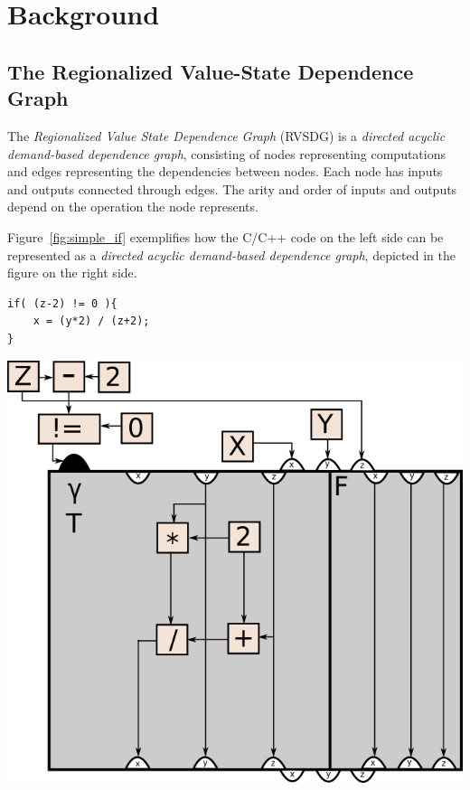 
\clearpage
\section{Background}
\label{background}

\subsection{The Regionalized Value-State Dependence Graph}
\label{background:RVSDG}

The \textit{Regionalized Value State Dependence Graph}\cite{RVSDG:HiPEACpaper}
(RVSDG) is a \textit{directed acyclic demand-based dependence graph},
consisting of nodes representing computations and edges representing the
dependencies between nodes. Each node has inputs and outputs connected through
edges. The arity and order of inputs and outputs depend on the operation the
node represents.

Figure~\ref{fig:simple_if} exemplifies how the C/C++ code on the left side can
be represented as a \textit{directed acyclic demand-based dependence graph},
depicted in the figure on the right side.

\begin{centering}
	\noindent\begin{minipage}{0.36\textwidth}
		\begin{CenteredBox}
		\begin{lstlisting}[label={lst:simple_if}, style=minipage_customcpp]
if( (z-2) != 0 ){
	x = (y*2) / (z+2);
}
		\end{lstlisting}
		\end{CenteredBox}
	\end{minipage}
	\noindent\begin{minipage}{0.55\textwidth}
		\captionsetup{type=figure}
		\includegraphics[width=\textwidth]{figures/simple_if_example}
	\end{minipage}
	\label{fig:simple_if}
\end{centering}

